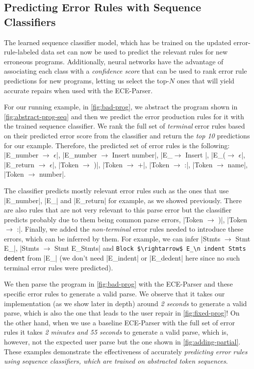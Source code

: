 \subsection{Predicting Error Rules with Sequence Classifiers}
\label{sec:overview:seq-classifiers}

The learned sequence classifier model,
which has be trained on the updated
error-rule-labeled data set can now
be used to predict the relevant rules
for new erroneous programs.
%
Additionally, neural networks have
the advantage of associating each
class with a \emph{confidence score}
that can be used to rank error rule
predictions for new programs, letting
us select the top-$N$ ones that will
yield accurate repairs when used
with the ECE-Parser.

For our running example, in \autoref{fig:bad-prog}, we abstract the program
shown in \autoref{fig:abstract-prog-seq} and then we predict the error
production rules for it with the trained sequence classifier. We rank the full
set of \emph{terminal} error rules based on their predicted error score from the
classifier and return the \emph{top 10} predictions for our example. Therefore,
the predicted set of error rules is the following:
%
|E_number $\rightarrow$ $\epsilon$|, \linebreak
%
|E_number $\rightarrow$ Insert number|, |E_\n $\rightarrow$ Insert \n|,
%
|E_($\rightarrow$ $\epsilon$|,
%
|E_return $\rightarrow$ $\epsilon$|, |Token $\rightarrow$ )|,
%
|Token $\rightarrow$ +|, |Token $\rightarrow$ :|, |Token $\rightarrow$ name|,
%
|Token $\rightarrow$ number|.

The classifier predicts mostly relevant error rules such as the ones that use
|E_number|, |E_\n| and |E_return| for example, as we showed previously. There
are also rules that are not very relevant to this parse error but the classifier
predicts probably due to them being common parse errors, \eg
%
|Token $\rightarrow$ )|, |Token $\rightarrow$ :|. Finally, we added the
\emph{non-terminal} error rules needed to introduce these errors, which can be
inferred by them. For example, we can infer
%
|Stmts $\rightarrow$ Stmt E_\n|, |Stmts $\rightarrow$ Stmt E_\n Stmts| and
%
\lstinline{Block $\rightarrow$ E_\n indent Stmts dedent} from |E_\n| (we don't
need \linebreak |E_indent| or |E_dedent| here since no such terminal error rules were
predicted).

We then parse the program in \autoref{fig:bad-prog} with the ECE-Parser and
these specific error rules to generate a valid parse. We observe that it takes
our implementation (as we show later in depth) around \emph{2 seconds} to
generate a valid parse, which is also the one that leads to the user repair in
\autoref{fig:fixed-prog}! On the other hand, when we use a baseline ECE-Parser
with the full set of error rules it takes \emph{2 minutes and 55 seconds} to
generate a valid parse, which is, however, not the expected user parse but the
one shown in \autoref{fig:adding-partial}. These examples demonstrate the
effectiveness of accurately \emph{predicting error rules using sequence
classifiers, which are trained on abstracted token sequences}.

